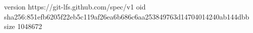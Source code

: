 version https://git-lfs.github.com/spec/v1
oid sha256:851efb6205f22eb5c119af26ea6b686c6aa253849763d14704014240ab144dbb
size 1048672
